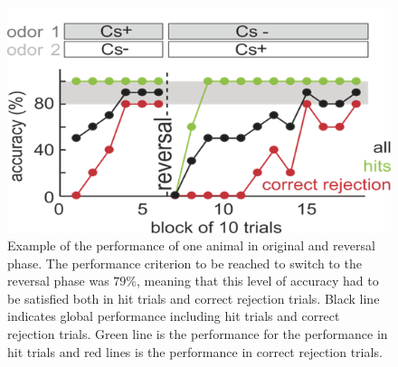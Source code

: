 \begin{framed}
\begin{figure}[H]
    \centering
\includegraphics[scale=0.8]{figures/Performance.png}
\caption{Example of the performance of one animal in original and reversal phase. The performance criterion to be reached to switch to the reversal phase was $79\%$, meaning that this level of accuracy had to be satisfied both in hit trials and correct rejection trials. Black line indicates global performance including hit trials and correct rejection trials. Green line is the performance for the performance in hit trials and red lines is the performance in correct rejection trials.}
\label{fig:performance}
\end{figure}
\end{framed}
